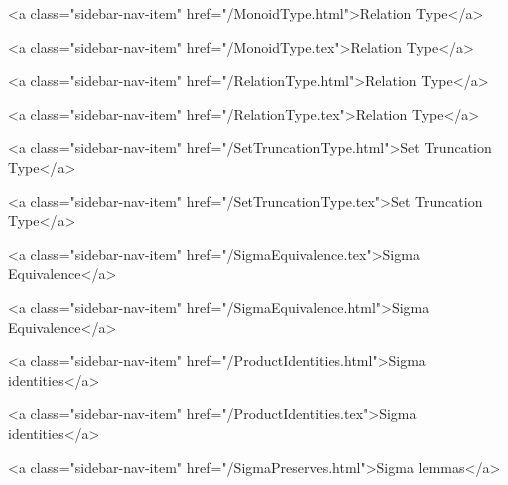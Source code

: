       
        
          <a class="sidebar-nav-item" href="/MonoidType.html">Relation Type</a>
        
      
    
      
        
          <a class="sidebar-nav-item" href="/MonoidType.tex">Relation Type</a>
        
      
    
      
        
          <a class="sidebar-nav-item" href="/RelationType.html">Relation Type</a>
        
      
    
      
        
          <a class="sidebar-nav-item" href="/RelationType.tex">Relation Type</a>
        
      
    
      
        
          <a class="sidebar-nav-item" href="/SetTruncationType.html">Set Truncation Type</a>
        
      
    
      
        
          <a class="sidebar-nav-item" href="/SetTruncationType.tex">Set Truncation Type</a>
        
      
    
      
        
          <a class="sidebar-nav-item" href="/SigmaEquivalence.tex">Sigma Equivalence</a>
        
      
    
      
        
          <a class="sidebar-nav-item" href="/SigmaEquivalence.html">Sigma Equivalence</a>
        
      
    
      
        
          <a class="sidebar-nav-item" href="/ProductIdentities.html">Sigma identities</a>
        
      
    
      
        
          <a class="sidebar-nav-item" href="/ProductIdentities.tex">Sigma identities</a>
        
      
    
      
        
          <a class="sidebar-nav-item" href="/SigmaPreserves.html">Sigma lemmas</a>
        
